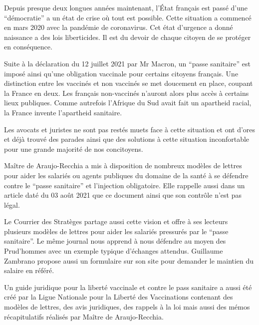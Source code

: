 \documentclass[a4paper]{article}
\begin{document}
\begin{multicols}{3}
\closearticle


Depuis presque deux longues années maintenant, l'État français est
passé d'une ``démocratie'' a un état de crise où tout est
possible. Cette situation a commencé en mars 2020 avec la pandémie de
coronavirus. Cet état d'urgence a donné naissance a des lois
liberticides. Il est du devoir de chaque citoyen de se protéger en
conséquence.

Suite à la déclaration du 12 juillet 2021 par Mr Macron, un ``passe
sanitaire'' est imposé ainsi qu'une obligation vaccinale pour certains
citoyens français. Une distinction entre les vaccinés et non vaccinés
se met doucement en place, coupant la France en deux. Les français
non-vaccinés n'auront alors plus accès à certains lieux
publiques. Comme autrefois l'Afrique du Sud avait fait un apartheid
racial, la France invente l'apartheid sanitaire.

Les avocats et juristes ne sont pas restés muets face à cette
situation et ont d'ores et déjà trouvé des parades ainsi que des
solutions à cette situation inconfortable pour une grande majorité de
nos concitoyens.

Maître de Araujo-Recchia a mis à disposition de nombreux modèles de
lettres\cite{AraujoRecchia:InjectionObligatoire} pour aider les salariés ou
agents publiques du domaine de la santé à se défendre contre le
``passe sanitaire'' et l'injection obligatoire. Elle rappelle aussi
dans un article daté du 03 août 2021 que ce document ainsi que son
contrôle n'est pas
légal\cite{AraujoRecchia:PassSanitaire}.

Le Courrier des Stratèges partage aussi cette vision et offre à ses
lecteurs plusieurs modèles de lettres pour aider les salariés
pressurés par le ``passe
sanitaire''\cite{CourrierDesStrateges:PassSanitaire}. Le même journal
nous apprend à nous défendre au moyen des
Prud'hommes\cite{CourrierDesStrateges:PrudHommes} avec un exemple
typique d'échanges attendus. Guillaume Zambrano propose aussi un
formulaire sur son site\cite{CourrierDesStrateges:PrudHommes} pour
demander le maintien du salaire en référé.

Un guide juridique pour la liberté vaccinale et contre le pass
sanitaire a aussi été créé par la Ligue Nationale pour la Liberté des
Vaccinations\cite{InfoVaccin:Guide} contenant des modèles de lettres,
des avis juridiques, des rappels à la loi mais aussi des mémos
récapitulatifs réalisés par Maître de Araujo-Recchia.


\end{multicols}
\end{document}
